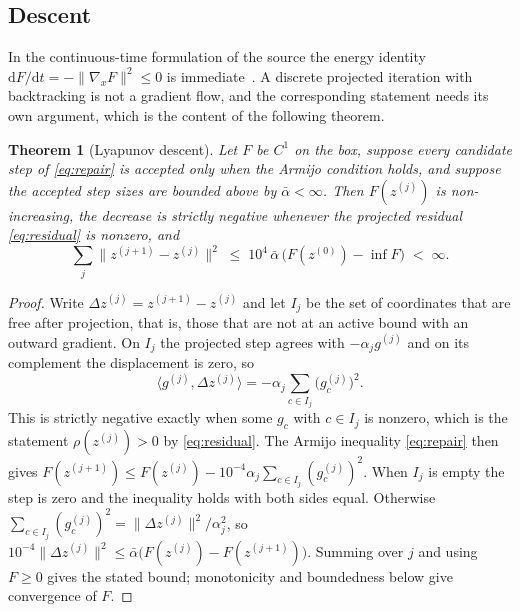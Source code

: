 \documentclass[11pt]{article}
\newtheorem{theorem}{Theorem}
\theoremstyle{definition}
\theoremstyle{remark}
\begin{document}
\subsection{Descent}
In the continuous-time formulation of the source the energy identity
$\mathrm dF/\mathrm dt=-\|\nabla_xF\|^2\le0$ is immediate~\cite{scellier2017}. A discrete projected
iteration with backtracking is not a gradient flow, and the corresponding statement needs its own
argument, which is the content of the following theorem.
\begin{theorem}[Lyapunov descent]
\label{thm:descent}
Let $F$ be $C^1$ on the box, suppose every candidate step of \eqref{eq:repair} is accepted only when the
Armijo condition holds, and suppose the accepted step sizes are bounded above by $\bar\alpha<\infty$.
Then $F(z^{(j)})$ is non-increasing, the decrease is strictly negative whenever the projected residual
\eqref{eq:residual} is nonzero, and
\begin{equation}
\sum_{j}\big\|z^{(j+1)}-z^{(j)}\big\|^2\;\le\;10^{4}\,\bar\alpha\,\big(F(z^{(0)})-\inf F\big)\;<\;\infty .
\end{equation}
\end{theorem}
\begin{proof}
Write $\Delta z^{(j)}=z^{(j+1)}-z^{(j)}$ and let $I_j$ be the set of coordinates that are free after
projection, that is, those that are not at an active bound with an outward gradient. On $I_j$ the
projected step agrees with $-\alpha_j g^{(j)}$ and on its complement the displacement is zero, so
\begin{equation}
\big\langle g^{(j)},\Delta z^{(j)}\big\rangle
=-\alpha_j\sum_{c\in I_j}\big(g^{(j)}_c\big)^2 .
\end{equation}
This is strictly negative exactly when some $g_c$ with $c\in I_j$ is nonzero, which is the statement
$\rho(z^{(j)})>0$ by \eqref{eq:residual}. The Armijo inequality \eqref{eq:repair} then gives
$F(z^{(j+1)})\le F(z^{(j)})-10^{-4}\alpha_j\sum_{c\in I_j}(g^{(j)}_c)^2$. When $I_j$ is empty the step is
zero and the inequality holds with both sides equal. Otherwise
$\sum_{c\in I_j}(g^{(j)}_c)^2=\|\Delta z^{(j)}\|^2/\alpha_j^2$, so
$10^{-4}\|\Delta z^{(j)}\|^2\le\bar\alpha\big(F(z^{(j)})-F(z^{(j+1)})\big)$. Summing over $j$ and using
$F\ge0$ gives the stated bound; monotonicity and boundedness below give convergence of $F$.
\end{proof}
\end{document}
